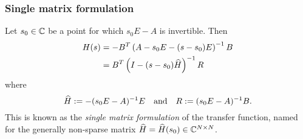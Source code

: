 \documentclass[letterpaper]{article}
\theoremstyle{remark}
\begin{document}
\begin{description}
	\subsubsection{Single matrix formulation}
	\label{sec:singlematrix}
	Let $s_0\in\mathbb{C}$ be a point for which $s_0E-A$ is invertible.
	Then 
	\begin{align}
			H(s)&= -B^T\left(A-s_0E-(s-s_0)E\right)^{-1}B\nonumber\\
				&= B^T\left(I-(s-s_0)\widehat{H}\right)^{-1}R 
	\label{eq:tfunc_single_matrix}
	\end{align}
	where
	\begin{equation}
			\widehat{H} := -(s_0E-A)^{-1}E\quad\textrm{and}\quad R := (s_0E-A)^{-1}B.	
	\label{eq:singlematrixdefs}
	\end{equation}
	This is known as the \emph{single matrix formulation} of the transfer function, 
	named for the generally non-sparse matrix $\widehat{H}=\widehat{H}(s_0)\in\mathbb{C}^{N\times N}$.


\begin{comment} %
    
	\subsubsection{Eigenvalue expansion formulation}
	We will assume $\A$ is diagonalizable and thus has the eigenvalue decomposition
	\begin{equation}
		 \A = Z\Lambda Z^{-1},
	\label{eq:eigDecomp}
	\end{equation}
	which substituted into \eqref{eq:tfunc_single_matrix} yields the
	\emph{eigenvalue expansion formulation} 
	\begin{align}
			H(s) &= B^TZ\left(I-(s-s_0)\Lambda\right)^{-1}Z^{-1}R\nonumber\\
			&= \sum_{j=1}^N \frac{X_j}{1-(s-s_0)\lambda_j},
			\label{eq:eig_sum}
   \end{align}
   where $\mathrm{diag}\{\lambda_1, \lambda_2,\ldots,\lambda_N\} = \Lambda$, and
	$X_j\in\C^{\nin\times \nin}$.

	Note that $\A=\A(s_0)$, and thus its eigenvalues $\lambda=\lambda(s_0)$,
	depend on $s_0$.
	
\end{comment} %
   
   
   

\end{description}
\end{document}
